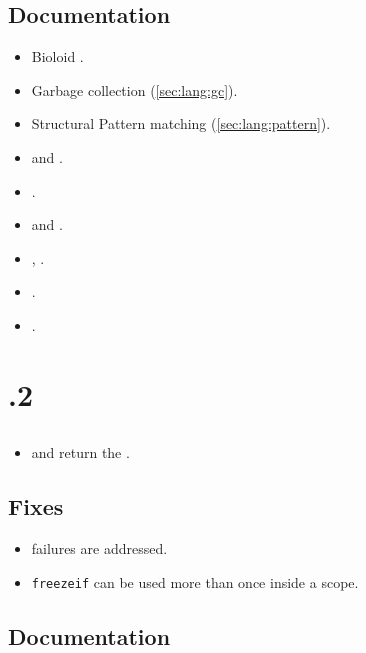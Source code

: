 \subsection{Documentation}
\begin{itemize}
\item Bioloid .
\item Garbage collection (\autoref{sec:lang:gc}).
\item Structural Pattern matching (\autoref{sec:lang:pattern}).
\item {} and .
\item {}.
\item {} and .
\item {}, .
\item {}.
\item {}.
\end{itemize}

\section{.2}

\subsection{\us}
\begin{itemize}
\item {} and  return the
  .
\end{itemize}

\subsection{Fixes}
\begin{itemize}
\item {} failures are addressed.
\item \lstinline|freezeif| can be used more than once inside a scope.
\end{itemize}

\subsection{Documentation}

